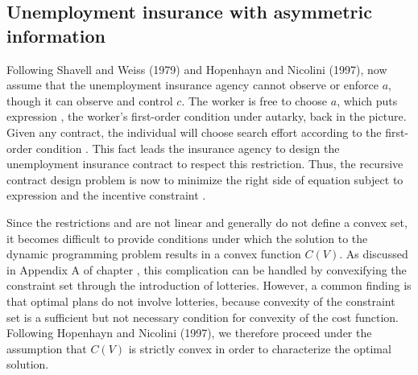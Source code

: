 \subsection{Unemployment insurance with asymmetric information}
Following Shavell and Weiss (1979) and Hopenhayn and Nicolini
(1997), now assume that  the unemployment insurance agency cannot
observe or enforce $a$, though it can observe and control $c$.
The worker is free to choose $a$, which puts expression , the worker's first-order condition under autarky,
back in the picture.
 Given any contract, the individual will choose search effort according to
the first-order condition .  This fact leads the insurance agency
to design the unemployment insurance contract to respect this restriction.
Thus, the recursive contract design problem is now to minimize the right side of equation
 subject to expression  and the incentive constraint .

Since the restrictions  and  are not linear
and generally do not define a convex set, it becomes difficult
to provide conditions under which the solution to the dynamic
programming problem results in a convex function $C(V)$. As
discussed in Appendix A of chapter ,
this complication can be handled by convexifying
the constraint set through the introduction of lotteries.
However, a common finding is that optimal plans do not involve
lotteries, because convexity of the constraint set is a sufficient
but not necessary condition for convexity of the cost function.
Following Hopenhayn and Nicolini (1997), we therefore proceed
under the assumption that $C(V)$ is strictly convex in order to
characterize the optimal solution.

